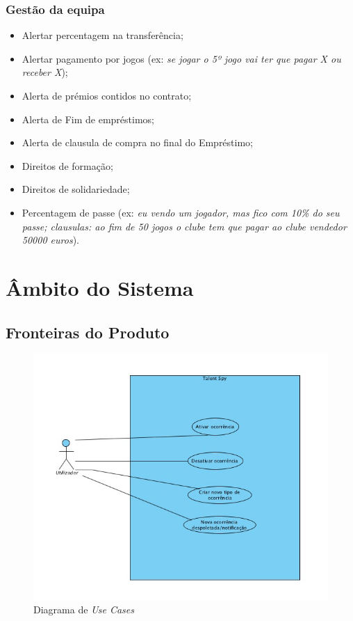 \subsubsection{Gestão da equipa}

\begin{itemize}
\item Alertar percentagem na transferência;
\item Alertar pagamento por jogos (ex: \emph{se jogar o 5º jogo vai ter que pagar X ou receber X});
\item Alerta de prémios contidos no contrato;
\item Alerta de Fim de empréstimos;
\item Alerta de clausula de compra no final do Empréstimo;
\item Direitos de formação;
\item Direitos de solidariedade;
\item Percentagem de passe (ex: \emph{eu vendo um jogador, mas fico com 10\% do seu passe; clausulas: ao fim de 50 jogos o clube tem que pagar ao clube vendedor 50000 euros}).
\end{itemize}

\section{Âmbito do Sistema}

\subsection{Fronteiras do Produto}

\begin{figure}[H]
    \centering
    \includegraphics[scale=0.6]{img/er.jpg}
    \caption{Diagrama de \emph{Use Cases}}
    \label{fig:use cases}
\end{figure}

